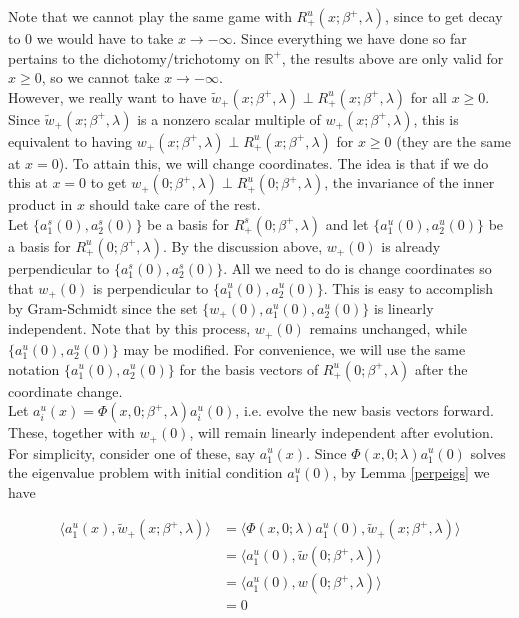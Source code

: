 \documentclass[12pt]{article}
\def\R{{\mathbb R}}
\begin{document}
Note that we cannot play the same game with $R^u_+(x; \beta^+, \lambda)$, since to get decay to 0 we would have to take $x \rightarrow -\infty$. Since everything we have done so far pertains to the dichotomy/trichotomy on $\R^+$, the results above are only valid for $x \geq 0$, so we cannot take $x \rightarrow -\infty$.\\

However, we really want to have $\tilde{w}_+(x; \beta^+, \lambda) \perp R^u_+(x; \beta^+, \lambda)$ for all $x \geq 0$. Since $\tilde{w}_+(x; \beta^+, \lambda)$ is a nonzero scalar multiple of $w_+(x; \beta^+, \lambda)$, this is equivalent to having $w_+(x; \beta^+, \lambda) \perp R^u_+(x; \beta^+, \lambda)$ for $x \geq 0$ (they are the same at $x = 0$). To attain this, we will change coordinates. The idea is that if we do this at $x = 0$ to get $w_+(0; \beta^+, \lambda) \perp R^u_+(0; \beta^+, \lambda)$, the invariance of the inner product in $x$ should take care of the rest.\\

Let $\{ a^s_1(0), a^s_2(0)\}$ be a basis for $R^s_+(0; \beta^+, \lambda)$ and let $\{a^u_1(0), a^u_2(0)\}$ be a basis for $R^u_+(0; \beta^+, \lambda)$. By the discussion above, $w_+(0)$ is already perpendicular to $\{ a^s_1(0), a^s_2(0)\}$. All we need to do is change coordinates so that $w_+(0)$ is perpendicular to $\{ a^u_1(0), a^u_2(0)\}$. This is easy to accomplish by Gram-Schmidt since the set $\{ w_+(0), a^u_1(0), a^u_2(0) \}$ is linearly independent. Note that by this process, $w_+(0)$ remains unchanged, while $\{ a^u_1(0), a^u_2(0) \}$ may be modified. For convenience, we will use the same notation $\{ a^u_1(0), a^u_2(0) \}$ for the basis vectors of $R^u_+(0; \beta^+, \lambda)$ after the coordinate change.\\

Let $a^u_i(x) = \Phi(x,0; \beta^+, \lambda)a^u_i(0)$, i.e. evolve the new basis vectors forward. These, together with $w_+(0)$, will remain linearly independent after evolution. For simplicity, consider one of these, say $a^u_1(x)$. Since $\Phi(x,0; \lambda) a^u_1(0)$ solves the eigenvalue problem with initial condition $a^u_1(0)$, by Lemma \ref{perpeigs} we have

\begin{align*}
\langle a^u_1(x), \tilde{w}_+(x; \beta^+, \lambda) \rangle &= \langle \Phi(x,0; \lambda) a^u_1(0), \tilde{w}_+(x; \beta^+, \lambda) \rangle \\
&= \langle a^u_1(0), \tilde{w}(0; \beta^+, \lambda) \rangle \\
&= \langle a^u_1(0), w(0; \beta^+, \lambda) \rangle \\
&= 0
\end{align*}
\end{document}
